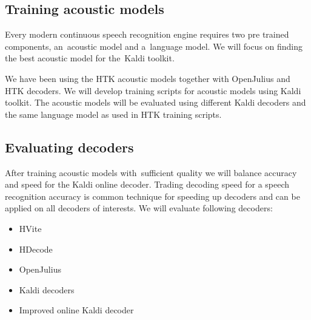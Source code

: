 {%



% 
% 

\subsection{Training acoustic models} 
\label{sub:training_kaldi_acoustic_models}
Every modern continuous speech recognition engine requires two pre trained components, an~acoustic model and a~language model. We will focus on finding the best acoustic model for the~Kaldi toolkit. 

We have been using the \ac{HTK} acoustic models together with OpenJulius and \ac{HTK} decoders. We will develop training scripts for acoustic models using Kaldi toolkit. The acoustic models will be evaluated using different Kaldi decoders and the same language model as used in \ac{HTK} training scripts. 

 

\subsection{Evaluating decoders} 
\label{sub:compare_rt}
After training acoustic models with~sufficient quality we will balance accuracy and speed for the Kaldi online decoder. Trading decoding speed for a speech recognition accuracy is common technique for speeding up decoders and can be applied on all decoders of interests. We will evaluate following decoders:
\begin{itemize}
    \item HVite  %
    \item HDecode %
    \item OpenJulius %
    \item Kaldi decoders
    \item Improved online Kaldi decoder
\end{itemize}

}
